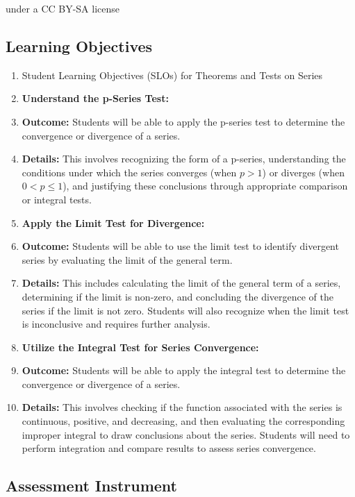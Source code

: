     under a CC BY-SA license

\subsection{Learning Objectives}

\begin{enumerate}
    \item Student Learning Objectives (SLOs) for Theorems and Tests on Series
    \item \textbf{Understand the p-Series Test:}
    \item \textbf{Outcome:} Students will be able to apply the p-series test to determine the convergence or divergence of a series.
    \item \textbf{Details:} This involves recognizing the form of a p-series, understanding the conditions under which the series converges (when $p > 1$) or diverges (when $0 < p \le 1$), and justifying these conclusions through appropriate comparison or integral tests.
    \item \textbf{Apply the Limit Test for Divergence:}
    \item \textbf{Outcome:} Students will be able to use the limit test to identify divergent series by evaluating the limit of the general term.
    \item \textbf{Details:} This includes calculating the limit of the general term of a series, determining if the limit is non-zero, and concluding the divergence of the series if the limit is not zero. Students will also recognize when the limit test is inconclusive and requires further analysis.
    \item \textbf{Utilize the Integral Test for Series Convergence:}
    \item \textbf{Outcome:} Students will be able to apply the integral test to determine the convergence or divergence of a series.
    \item \textbf{Details:} This involves checking if the function associated with the series is continuous, positive, and decreasing, and then evaluating the corresponding improper integral to draw conclusions about the series. Students will need to perform integration and compare results to assess series convergence.
\end{enumerate}

\subsection{Assessment Instrument}


